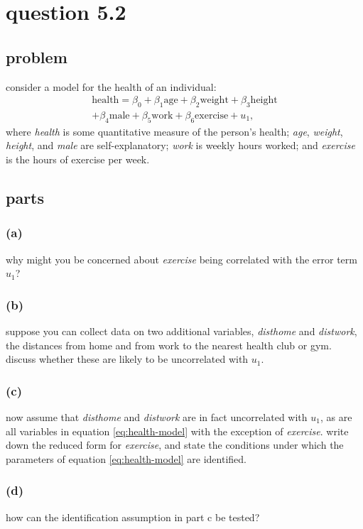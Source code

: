 \documentclass[10pt, a4paper]{article}
\begin{document}
  \section*{question 5.2}
    \subsection*{problem}
      consider a model for the health of an individual:
      \begin{gather}
        \text{health} = \beta_0 + \beta_1\text{age} + \beta_2\text{weight} + \beta_3\text{height} \nonumber \\
        + \beta_4\text{male} + \beta_5\text{work} + \beta_6\text{exercise} + u_1, \label{eq:health-model}
      \end{gather}
      where \textit{health} is some quantitative measure of the person's health; \textit{age}, \textit{weight}, \textit{height}, and \textit{male} are self-explanatory; \textit{work} is weekly hours worked; and \textit{exercise} is the hours of exercise per week.
    \subsection*{parts}
      \subsubsection*{(a)}
        why might you be concerned about \textit{exercise} being correlated with the error term $u_1$?
      \subsubsection*{(b)}
        suppose you can collect data on two additional variables, \textit{disthome} and \textit{distwork}, the distances from home and from work to the nearest health club or gym. discuss whether these are likely to be uncorrelated with $u_1$.
      \subsubsection*{(c)}
        now assume that \textit{disthome} and \textit{distwork} are in fact uncorrelated with $u_1$, as are all variables in equation \eqref{eq:health-model} with the exception of \textit{exercise}. write down the reduced form for \textit{exercise}, and state the conditions under which the parameters of equation \eqref{eq:health-model} are identified.
      \subsubsection*{(d)}
        how can the identification assumption in part c be tested?
\end{document}
